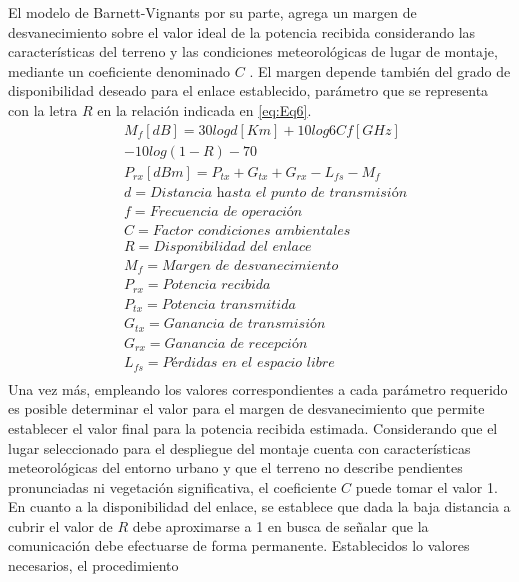 \documentclass[conference]{IEEEtran}
\begin{document}
El modelo de Barnett-Vignants por su parte, agrega un margen de desvanecimiento sobre el valor ideal de
la potencia recibida considerando las características del terreno y las condiciones meteorológicas de lugar
de montaje, mediante un coeficiente denominado $C$ \cite{b3}. El margen depende también del grado de disponibilidad deseado 
para el enlace establecido, parámetro que se representa con la letra $R$ en la relación indicada en \ref{eq:Eq6}. 
\begin{equation}
    \label{eq:Eq6}
    \begin{aligned}
        &M_{f}[dB] = 30logd[Km] + 10log6Cf[GHz]\\
        & - 10log(1-R) - 70\\
        &P_{rx}[dBm] = P_{tx} + G_{tx} + G_{rx} - L_{fs} - M_{f}\\
        &d = \textit{Distancia hasta el punto de transmisión}\\
        &f = \textit{Frecuencia de operación}\\
        &C = \textit{Factor condiciones ambientales}\\
        &R = \textit{Disponibilidad del enlace}\\
        &M_{f} = \textit{Margen de desvanecimiento}\\
        &P_{rx} = \textit{Potencia recibida}\\
        &P_{tx} = \textit{Potencia transmitida}\\
        &G_{tx} = \textit{Ganancia de transmisión}\\
        &G_{rx} = \textit{Ganancia de recepción}\\
        &L_{fs} = \textit{Pérdidas en el espacio libre}\\
    \end{aligned}
\end{equation}
Una vez más, empleando los valores correspondientes a cada parámetro requerido es posible determinar el valor
para el margen de desvanecimiento que permite establecer el valor final para la potencia recibida estimada. Considerando
que el lugar seleccionado para el despliegue del montaje cuenta con características meteorológicas del entorno urbano y
que el terreno no describe pendientes pronunciadas ni vegetación significativa, el coeficiente $C$ puede tomar el valor 1.
En cuanto a la disponibilidad del enlace, se establece que dada la baja distancia a cubrir el valor de $R$ debe aproximarse 
a 1 en busca de señalar que la comunicación debe efectuarse de forma permanente. Establecidos lo valores necesarios, el procedimiento 
\end{document}
